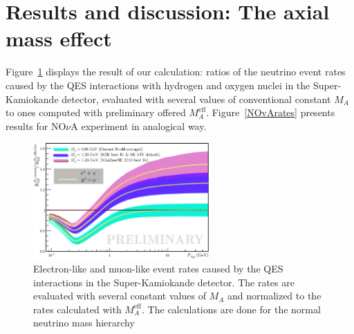 \section{Results and discussion: The axial mass effect}
Figure~\ref{SKrates} displays the result of our calculation: ratios of the neutrino event rates caused by the QES interactions with hydrogen and oxygen nuclei in the Super-Kamiokande detector, evaluated with several values of conventional constant $M_{A}$ to ones computed with preliminary offered $M_{A}^{\mathrm{eff}}$. Figure~\ref{NOvArates} presents results for NO$\nu$A experiment in analogical way.

\begin{figure}[h!]
\begin{center}
\includegraphics[width=0.6\textwidth]{./SK/cvsv2lmn_all2.eps}
\caption{\label{SKrates}Electron-like and muon-like event rates caused by the QES interactions in the Super-Kamiokande detector. The rates are evaluated with several constant values of $M_{A}$ and normalized to the rates calculated with $M_{A}^{\mathrm{eff}}$. The calculations are done for the normal neutrino mass hierarchy}
\end{center}
\end{figure}

